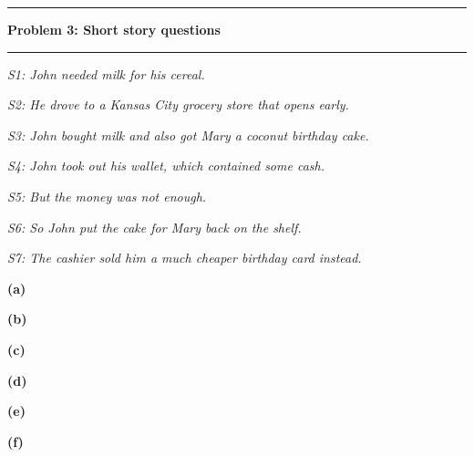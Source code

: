 \documentclass[11pt]{article}
\newcommand\question[2]{\vspace{.25in}\hrule\textbf{#1: #2}\vspace{.5em}\hrule\vspace{.10in}}
\renewcommand\part[1]{\vspace{.10in}\textbf{(#1)}}
\begin{document}
\question{Problem 3}{Short story questions}

\qquad \emph{S1: John needed milk for his cereal.}

\qquad \emph{S2: He drove to a Kansas City grocery store that opens early.}

\qquad \emph{S3: John bought milk and also got Mary a coconut birthday cake.}

\qquad \emph{S4: John took out his wallet, which contained some cash.}

\qquad \emph{S5: But the money was not enough.}

\qquad \emph{S6: So John put the cake for Mary back on the shelf.}

\qquad \emph{S7: The cashier sold him a much cheaper birthday card instead.}

\part{a}

\part{b}

\part{c}

\part{d}

\part{e}

\part{f}
\end{document}
